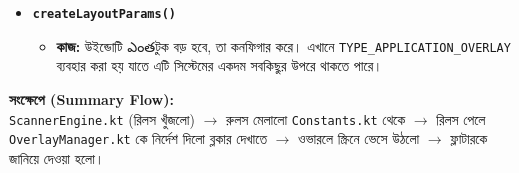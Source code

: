 \documentclass[12pt, a4paper]{article}
\begin{document}
\begin{tcolorbox}[colback=orange!5!white,colframe=orange!75!black,title={৩. OverlayManager.kt}]
\begin{itemize}[label=$\circ$]
    \item \textbf{\texttt{createLayoutParams()}}
    \begin{itemize}[label=--]
        \item \textbf{কাজ:} উইন্ডোটি ఎంతটুক বড় হবে, তা কনফিগার করে। এখানে \texttt{TYPE\_APPLICATION\_OVERLAY} ব্যবহার করা হয় যাতে এটি সিস্টেমের একদম সবকিছুর উপরে থাকতে পারে।
    \end{itemize}
\end{itemize}
\end{tcolorbox}

\vspace{0.5cm}
\textbf{সংক্ষেপে (Summary Flow):}\\
\texttt{ScannerEngine.kt} (রিলস খুঁজলো) $\rightarrow$ রুলস মেলালো \texttt{Constants.kt} থেকে $\rightarrow$ রিলস পেলে \texttt{OverlayManager.kt} কে নির্দেশ দিলো ব্লকার দেখাতে $\rightarrow$ ওভারলে স্ক্রিনে ভেসে উঠলো $\rightarrow$ ফ্লাটারকে জানিয়ে দেওয়া হলো।
\end{document}
